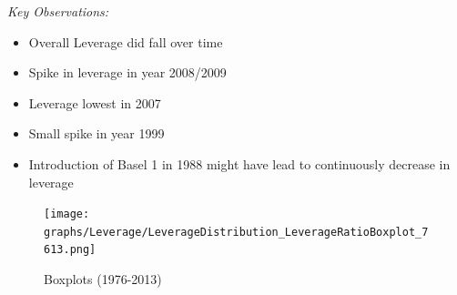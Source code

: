 \documentclass[12pt, a4paper]{article} %
\begin{document}
\noindent \textit{Key Observations:}
\begin{itemize}
\item Overall Leverage did fall over time
\item Spike in leverage in year 2008/2009
\item Leverage lowest in 2007
\item Small spike in year 1999
\item Introduction of Basel 1 in 1988 might have lead to continuously decrease in leverage
\end{itemize}

\begin{figure}[hbtp]
\centering
\caption{Boxplots (1976-2013)}
\texttt{[image: graphs/Leverage/LeverageDistribution\_LeverageRatioBoxplot\_7613.png]}
\end{figure}

\pagebreak
\end{document}

